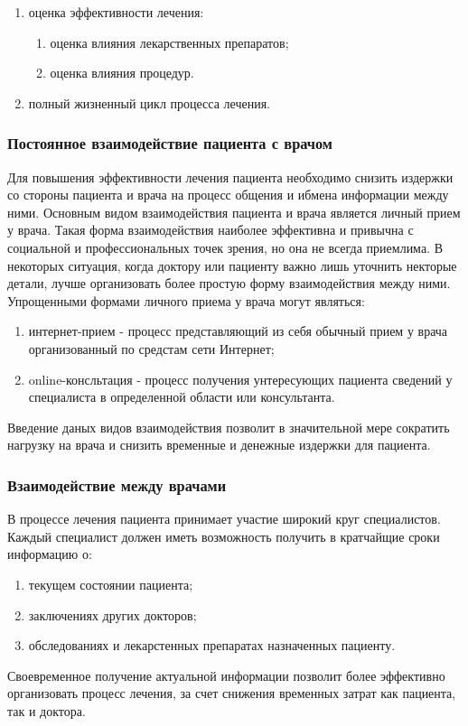 \begin{enumerate}
	\item оценка эффективности лечения:
		\begin{enumerate}
			\item оценка влияния лекарственных препаратов;
			\item оценка влияния процедур.
		\end{enumerate}
	\item полный жизненный цикл процесса лечения.
\end{enumerate}

\subsubsection{Постоянное взаимодействие пациента с врачом}

Для повышения эффективности лечения пациента необходимо снизить издержки со
стороны пациента и врача на процесс общения и ибмена информации между ними.
Основным видом взаимодействия пациента и врача является личный прием у врача.
Такая форма взаимодействия наиболее эффективна и привычна с социальной и
профессиональных точек зрения, но она не всегда приемлима. В некоторых ситуация,
когда доктору или пациенту важно лишь уточнить некторые детали, лучше
организовать более простую форму взаимодействия между ними. Упрощенными формами
личного приема у врача могут являться:

\begin{enumerate}
  	\item интернет-прием - процесс представляющий из себя обычный прием у врача
организованный по средстам сети Интернет;
	\item  online-консльтация - процесс получения
унтересующих пациента сведений у специалиста в определенной области или
консультанта.
\end{enumerate}
 
Введение даных видов взаимодействия позволит в значительной мере сократить
нагрузку на врача и снизить временные и денежные издержки для пациента.

\subsubsection{Взаимодействие между врачами}

В процессе лечения пациента принимает участие широкий круг специалистов. Каждый
специалист должен иметь возможность получить в кратчайщие сроки информацию о:

\begin{enumerate}
	\item текущем состоянии пациента;
	\item заключениях других докторов;
	\item обследованиях и лекарстенных препаратах назначенных пациенту.
\end{enumerate}

Своевременное получение актуальной информации позволит более эффективно
организовать процесс лечения, за счет снижения временных затрат как пациента,
так и доктора.

